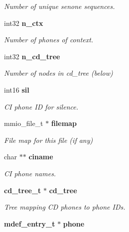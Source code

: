 \begin{DoxyCompactItemize}
\begin{DoxyCompactList}\small\item\em Number of unique senone sequences. \end{DoxyCompactList}\item 
int32 {\bf n\+\_\+ctx}\label{structbin__mdef__s_a31b5cda5136c6f72816da8889719bfe2}

\begin{DoxyCompactList}\small\item\em Number of phones of context. \end{DoxyCompactList}\item 
int32 {\bf n\+\_\+cd\+\_\+tree}\label{structbin__mdef__s_ad625c3c55d5f42ed275b8b5638a6d80b}

\begin{DoxyCompactList}\small\item\em Number of nodes in cd\+\_\+tree (below) \end{DoxyCompactList}\item 
int16 {\bf sil}\label{structbin__mdef__s_a9071b7698132c1c2ce92a6f742e1c82f}

\begin{DoxyCompactList}\small\item\em C\+I phone I\+D for silence. \end{DoxyCompactList}\item 
mmio\+\_\+file\+\_\+t $\ast$ {\bf filemap}\label{structbin__mdef__s_a3358a80c50bf3f62417596553adf9c5e}

\begin{DoxyCompactList}\small\item\em File map for this file (if any) \end{DoxyCompactList}\item 
char $\ast$$\ast$ {\bf ciname}\label{structbin__mdef__s_afdd0df913746b0656186fc8c3e8a9206}

\begin{DoxyCompactList}\small\item\em C\+I phone names. \end{DoxyCompactList}\item 
{\bf cd\+\_\+tree\+\_\+t} $\ast$ {\bf cd\+\_\+tree}\label{structbin__mdef__s_a0642be2bb56149689ad3fc1dad1e5d55}

\begin{DoxyCompactList}\small\item\em Tree mapping C\+D phones to phone I\+Ds. \end{DoxyCompactList}\item 
{\bf mdef\+\_\+entry\+\_\+t} $\ast$ {\bf phone}\label{structbin__mdef__s_a2c73ae900d198460a30bce4f641d8398}


\end{DoxyCompactItemize}
